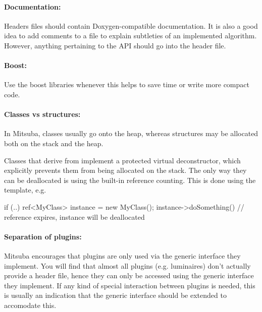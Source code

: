 \paragraph{Documentation:} Headers files should contain
Doxygen-compatible documentation. It is also a good idea to add
comments to a  file to explain subtleties of an implemented algorithm. 
However, anything pertaining to the API should go into the header file.

\paragraph{Boost:} Use the boost libraries whenever this helps to save
time or write more compact code.

\paragraph{Classes vs structures:}In Mitsuba, classes usually go onto the heap,
whereas structures may be allocated both on the stack and the heap. 

Classes that derive from  implement a protected virtual
deconstructor, which explicitly prevents them from being allocated on the stack.
The only way they can be deallocated is using the built-in reference
counting. This is done using the  template, e.g.

\begin{cpp}
if (..) {
	ref<MyClass> instance = new MyClass();
	instance->doSomething()
}   // reference expires, instance will be deallocated
\end{cpp}

\paragraph{Separation of plugins:}Mitsuba encourages that plugins are only
used via the generic interface they implement. You will find that almost all plugins
(e.g. luminaires) don't actually provide a header file, hence they can only be accessed
using the generic  interface they implement. If any kind of special 
interaction between plugins is needed, this is usually an indication that the 
generic interface should be extended to accomodate this.
